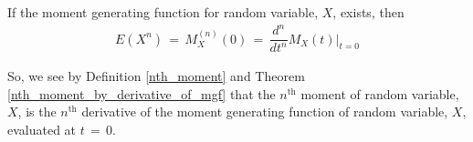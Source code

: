 \begin{theorem}
    \label{nth_moment_by_derivative_of_mgf}
    If the moment generating function for random variable, $X$, exists, then
    \begin{align*}
        E(X^{n}) \hspace{2pt} = \hspace{2pt} M_{X}^{(n)}(0) \hspace{2pt} = \hspace{2pt} \dfrac{d^{n}}{dt^{n}}M_{X}(t)\Big|_{t = 0}  
    \end{align*}
\end{theorem}

So, we see by Definition \ref{nth_moment} and Theorem \ref{nth_moment_by_derivative_of_mgf} that the $n^{\text{th}}$ moment of random variable, $X$, is the $n^{\text{th}}$ derivative of the moment generating function of random variable, $X$, evaluated at $t \hspace{2pt} = \hspace{2pt} 0$.